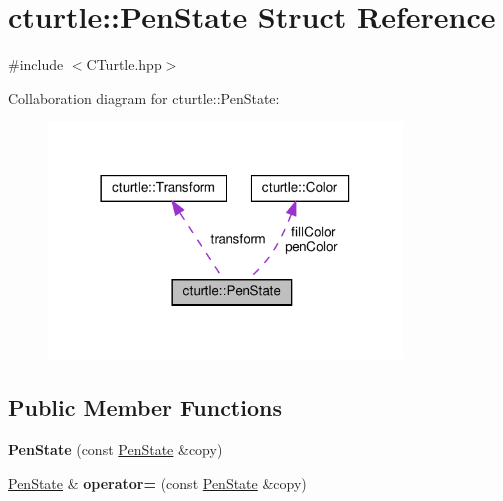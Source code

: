 \hypertarget{structcturtle_1_1PenState}{}\section{cturtle\+:\+:Pen\+State Struct Reference}
\label{structcturtle_1_1PenState}


{\ttfamily \#include $<$C\+Turtle.\+hpp$>$}



Collaboration diagram for cturtle\+:\+:Pen\+State\+:\nopagebreak
\begin{figure}[H]
\begin{center}
\leavevmode
\includegraphics[width=266pt]{structcturtle_1_1PenState__coll__graph}
\end{center}
\end{figure}
\subsection*{Public Member Functions}
\begin{DoxyCompactItemize}
\item 
\mbox{\label{structcturtle_1_1PenState_a308973ed85eee69acd4f98b72e2be21c}} 
{\bfseries Pen\+State} (const \hyperlink{structcturtle_1_1PenState}{Pen\+State} \&copy)
\item 
\mbox{\label{structcturtle_1_1PenState_aa324f2f3a6cc360d8d927e677c6b6d1a}} 
\hyperlink{structcturtle_1_1PenState}{Pen\+State} \& {\bfseries operator=} (const \hyperlink{structcturtle_1_1PenState}{Pen\+State} \&copy)
\end{DoxyCompactItemize}
